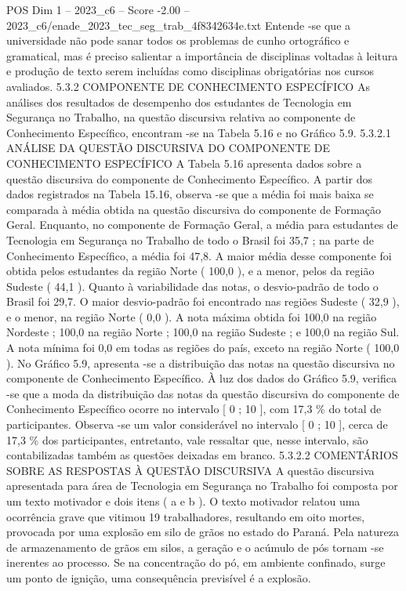 \begin{textsample}{POS Dim 1 – 2023\_c6 – Score -2.00 – 2023\_c6/enade\_2023\_tec\_seg\_trab\_4f8342634e.txt}
Entende -se que a universidade não pode sanar todos os problemas de cunho ortográfico e gramatical, mas é preciso salientar a importância de disciplinas voltadas à leitura e produção de texto serem incluídas como disciplinas obrigatórias nos cursos avaliados. 5.3.2 COMPONENTE DE CONHECIMENTO ESPECÍFICO As análises dos resultados de desempenho dos estudantes de Tecnologia em Segurança no Trabalho, na questão discursiva relativa ao componente de Conhecimento Específico, encontram -se na Tabela 5.16 e no Gráfico 5.9. 5.3.2.1 ANÁLISE DA QUESTÃO DISCURSIVA DO COMPONENTE DE CONHECIMENTO ESPECÍFICO A Tabela 5.16 apresenta dados sobre a questão discursiva do componente de Conhecimento Específico.
A partir dos dados registrados na Tabela 15.16, observa -se que a média foi mais baixa se comparada à média obtida na questão discursiva do componente de Formação Geral.
Enquanto, no componente de Formação Geral, a média para estudantes de Tecnologia em Segurança no Trabalho de todo o Brasil foi 35,7 ; na parte de Conhecimento Específico, a média foi 47,8.
A maior média desse componente foi obtida pelos estudantes da região Norte ( 100,0 ), e a menor, pelos da região Sudeste ( 44,1 ).
Quanto à variabilidade das notas, o desvio-padrão de todo o Brasil foi 29,7.
O maior desvio-padrão foi encontrado nas regiões Sudeste ( 32,9 ), e o menor, na região Norte ( 0,0 ).
A nota máxima obtida foi 100,0 na região Nordeste ; 100,0 na região Norte ; 100,0 na região Sudeste ; e 100,0 na região Sul.
A nota mínima foi 0,0 em todas as regiões do país, exceto na região Norte ( 100,0 ).
No Gráfico 5.9, apresenta -se a distribuição das notas na questão discursiva no componente de Conhecimento Específico.
À luz dos dados do Gráfico 5.9, verifica -se que a moda da distribuição das notas da questão discursiva do componente de Conhecimento Específico ocorre no intervalo [ 0 ; 10 ], com 17,3 \% do total de participantes.
Observa -se um valor considerável no intervalo [ 0 ; 10 ], cerca de 17,3 \% dos participantes, entretanto, vale ressaltar que, nesse intervalo, são contabilizadas também as questões deixadas em branco. 5.3.2.2 COMENTÁRIOS SOBRE AS RESPOSTAS À QUESTÃO DISCURSIVA A questão discursiva apresentada para área de Tecnologia em Segurança no Trabalho foi composta por um texto motivador e dois itens ( a e b ).
O texto motivador relatou uma ocorrência grave que vitimou 19 trabalhadores, resultando em oito mortes, provocada por uma explosão em silo de grãos no estado do Paraná.
Pela natureza de armazenamento de grãos em silos, a geração e o acúmulo de pós tornam -se inerentes ao processo.
Se na concentração do pó, em ambiente confinado, surge um ponto de ignição, uma consequência previsível é a explosão.

\end{textsample}
